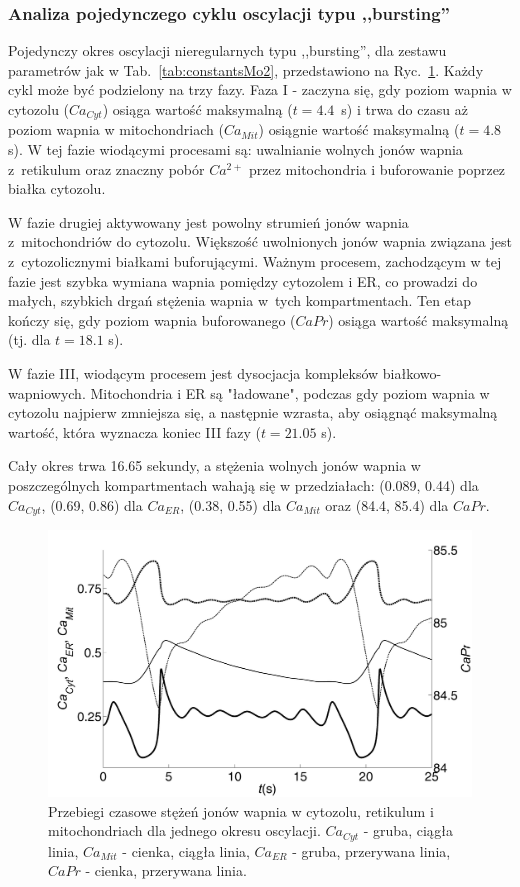 \FloatBarrier
\subsubsection*{Analiza pojedynczego cyklu oscylacji typu ,,bursting''}

Pojedynczy okres oscylacji nieregularnych typu ,,bursting'', dla zestawu parametrów jak w Tab.~\ref{tab:constantsMo2}, przedstawiono na Ryc.~\ref{fig:jedenOkresMo2}. Każdy cykl może być podzielony na trzy fazy. Faza I - zaczyna się, gdy poziom wapnia w cytozolu ($Ca_{Cyt}$) osiąga wartość maksymalną ($t = 4.4$~s) i trwa do czasu aż poziom wapnia w mitochondriach ($Ca_{Mit}$) osiągnie wartość maksymalną ($t = 4.8$ s). W tej fazie wiodącymi procesami są: uwalnianie wolnych jonów wapnia z~retikulum oraz znaczny pobór $Ca^{2+}$ przez mitochondria i buforowanie poprzez białka cytozolu. 

W fazie drugiej aktywowany jest powolny strumień jonów wapnia z~mitochondriów do cytozolu. Większość uwolnionych jonów wapnia związana jest z~cytozolicznymi białkami buforującymi. Ważnym procesem, zachodzącym w tej fazie jest szybka wymiana wapnia pomiędzy cytozolem i ER, co prowadzi do małych, szybkich drgań stężenia wapnia w~tych kompartmentach. Ten etap kończy się, gdy poziom wapnia buforowanego ($CaPr$) osiąga wartość maksymalną (tj. dla $t = 18.1$ s).

W fazie III, wiodącym procesem jest dysocjacja kompleksów białkowo-wapniowych. Mitochondria i ER są "ładowane", podczas gdy poziom wapnia w cytozolu najpierw zmniejsza się, a następnie wzrasta, aby osiągnąć maksymalną wartość, która wyznacza koniec III fazy ($t = 21.05$ s). 

Cały okres trwa 16.65 sekundy, a stężenia wolnych jonów wapnia w poszczególnych kompartmentach wahają się w przedziałach: (0.089, 0.44) dla  $Ca_{Cyt}$, (0.69, 0.86) dla $Ca_{ER}$,  (0.38, 0.55) dla $Ca_{Mit}$ oraz (84.4, 85.4) dla $CaPr$.

\begin{figure}[ht]
    \centering
    \includegraphics[width=1\textwidth]{rysunki/rozdzial_5/one_periodMo2}
    \caption[Przebiegi czasowe, jeden okres w Modelu \#2]{Przebiegi czasowe  stężeń jonów wapnia w cytozolu, retikulum i mitochondriach dla jednego okresu oscylacji. $Ca_{Cyt}$ - gruba, ciągła linia, $Ca_{Mit}$ - cienka, ciągła linia, $Ca_{ER}$ - gruba, przerywana linia, $CaPr$ - cienka, przerywana linia.}
    \label{fig:jedenOkresMo2}
\end{figure}

